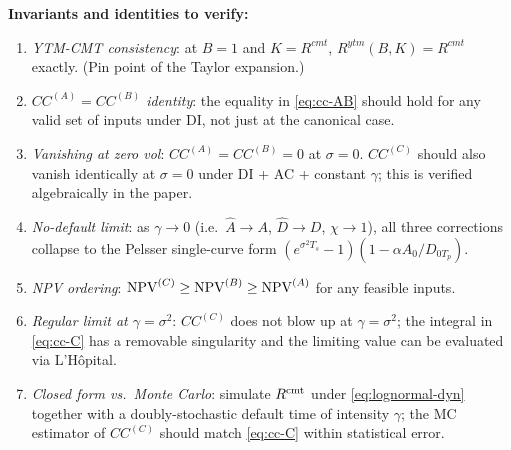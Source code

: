 \documentclass[11pt,a4paper]{article}
\begin{document}
\begin{validation}
\textbf{Invariants and identities to verify:}
\begin{enumerate}[noitemsep]
  \item \emph{YTM-CMT consistency}: at $B = 1$ and $K = R^{cmt}$,
        $R^{ytm}(B, K) = R^{cmt}$ exactly. (Pin point of the Taylor
        expansion.)
  \item \emph{$CC^{(A)} = CC^{(B)}$ identity}: the equality in
        \eqref{eq:cc-AB} should hold for any valid set of inputs
        under DI, not just at the canonical case.
  \item \emph{Vanishing at zero vol}: $CC^{(A)} = CC^{(B)} = 0$ at
        $\sigma = 0$. $CC^{(C)}$ should also vanish identically at
        $\sigma = 0$ under DI + AC + constant $\gamma$; this is
        verified algebraically in the paper.
  \item \emph{No-default limit}: as $\gamma \to 0$ (i.e.\
        $\widehat A \to A$, $\widehat D \to D$, $\chi \to 1$), all
        three corrections collapse to the Pelsser
        single-curve form $(e^{\sigma^2 T_s} - 1)(1 - \alpha A_0 / D_{0T_p})$.
  \item \emph{NPV ordering}: $\mathrm{NPV}^{(C)} \ge \mathrm{NPV}^{(B)} \ge \mathrm{NPV}^{(A)}$
        for any feasible inputs.
  \item \emph{Regular limit at $\gamma = \sigma^2$}: $CC^{(C)}$ does
        not blow up at $\gamma = \sigma^2$; the integral in
        \eqref{eq:cc-C} has a removable singularity and the limiting
        value can be evaluated via L'H\^opital.
  \item \emph{Closed form vs.\ Monte Carlo}: simulate $R^{\mathrm{cmt}}$ under
        \eqref{eq:lognormal-dyn} together with a doubly-stochastic
        default time of intensity $\gamma$; the MC estimator of
        $CC^{(C)}$ should match \eqref{eq:cc-C} within statistical
        error.
\end{enumerate}
\end{validation}

\end{document}
